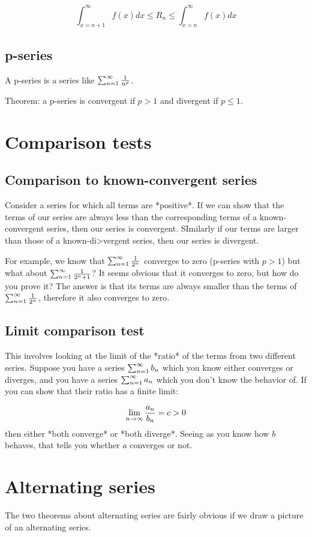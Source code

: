 $$
\int_{x=n+1}^\infty f(x) dx \leq R_n \leq \int_{x=n}^\infty f(x) dx
$$


\subsection{p-series}

A p-series is a series like $\sum_{n=1}^{\infty} \frac{1}{n^p}$.

Theorem: a p-series is convergent if $p>1$ and divergent if $p \leq 1$.

\section{Comparison tests}

\subsection{Comparison to known-convergent series}
Consider a series for which all terms are *positive*. If we can show that the terms of our series are always less than the corresponding terms of a known-convergent series, then our series is convergent. SImilarly if our terms are larger than those of a known-di>vergent series, then our series is divergent.

For example, we know that $\sum_{n=1}^{\infty}\frac{1}{2^n}$ converges to zero (p-series with $p > 1$) but what about $\sum_{n=1}^{\infty}\frac{1}{2^n + 1}$? It seems obvious that it converges to zero, but how do you prove it? The answer is that its terms are always smaller than the terms of $\sum_{n=1}^{\infty}\frac{1}{2^n}$, therefore it also converges to zero.


\subsection{Limit comparison test}
This involves looking at the limit of the *ratio* of the terms from two different series. Suppose you have a series $\sum_{n=1}^{\infty} b_n$ which you know either converges or diverges, and you have a series $\sum_{n=1}^{\infty} a_n$ which you don't know the behavior of. If you can show that their ratio has a finite limit:

$$
\lim\limits_{n \to \infty} \frac{a_n}{b_n} = c > 0
$$
then either *both converge* or *both diverge*. Seeing as you know how $b$ behaves, that tells you whether $a$ converges or not.


\section{Alternating series}
The two theorems about alternating series are fairly obvious if we draw a picture of an alternating series.

